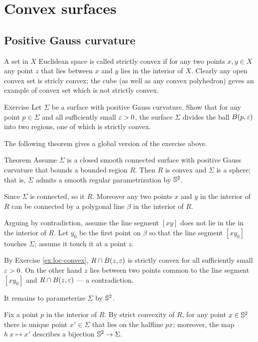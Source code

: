 \chapter{Convex surfaces}


\section{Positive Gauss curvature}
A set in $X$ Euclidean space is called strictly convex if for any two points $x,y\in X$ any point $z$ that lies between $x$ and $y$ lies in the interior of $X$.
Clearly any open convex set is stricly convex;
the cube (as well as any convex polyhedron) geves an example of convex set which is not strictly convex.

\begin{thm}{Exercise}\label{ex:loc-convex}
Let $\Sigma$ be a surface with positive Gauss curvature.
Show that for any point $p\in \Sigma$ and all sufficiently small $\varepsilon>0$,
the surface $\Sigma$ divides the ball $B(p,\varepsilon)$ into two regions, one of which is strictly convex.
\end{thm}

The following theorem gives a global version of the exercise above.

\begin{thm}{Theorem}
Assume $\Sigma$ is a closed smooth connected surface with positive Gauss curvature that bounds a bounded region $R$.
Then $R$ is convex and $\Sigma$ is a sphere; that is, $\Sigma$ admits a smooth regular parametrization by $\mathbb{S}^2$.

\end{thm}

 Since $\Sigma$ is connected, so it $R$.
Moreover any two points $x$ and $y$ in the interior of $R$ can be connected by a polygonal line $\beta$ in the interior of $R$.

Arguing by contradiction, assume the line segment $[xy]$ does not lie in the   in the interior of $R$.
Let $y_0$ be the first point on $\beta$ so that the line segment $[xy_0]$ touches $\Sigma$; assume it touch it at a point $z$.

By Exercise \ref{ex:loc-convex}, $R\cap B(z,\varepsilon)$ is strictly convex for all sufficiently small $\varepsilon>0$.
On the other hand $z$ lies between two points common to the line segment $[xy_0]$ and $R\cap B(z,\varepsilon)$ --- a contradiction.

It remains to parameterize $\Sigma$ by $\mathbb{S}^2$.

Fix a point $p$ in the interior of $R$.
By strict convexity of $R$, for any point $x\in \mathbb{S}^2$ there is unique point $x'\in \Sigma$ that lies on the halfline $px$;
moreover, the map $h\:x\mapsto x'$ describes a bijection $\mathbb{S}^2\to \Sigma$.

